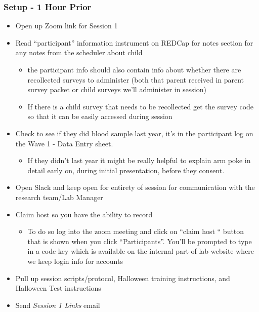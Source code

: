 \documentclass[]{book}
\providecommand{\tightlist}{%
  \setlength{\itemsep}{0pt}\setlength{\parskip}{0pt}}
\begin{document}
\hypertarget{setup---1-hour-prior-1}{%
\subsubsection{Setup - 1 Hour Prior}\label{setup---1-hour-prior-1}}

\begin{itemize}
\tightlist
\item
  Open up Zoom link for Session 1
\item
  Read ``participant'' information instrument on REDCap for notes section for any notes from the scheduler about child

  \begin{itemize}
  \tightlist
  \item
    the participant info should also contain info about whether there are recollected surveys to administer (both that parent received in parent survey packet or child surveys we'll administer in session)
  \item
    If there is a child survey that needs to be recollected get the survey code so that it can be easily accessed during session
  \end{itemize}
\item
  Check to see if they did blood sample last year, it's in the participant log on the Wave 1 - Data Entry sheet.

  \begin{itemize}
  \tightlist
  \item
    If they didn't last year it might be really helpful to explain arm poke in detail early on, during initial presentation, before they consent.
  \end{itemize}
\item
  Open Slack and keep open for entirety of session for communication with the research team/Lab Manager
\item
  Claim host so you have the ability to record

  \begin{itemize}
  \tightlist
  \item
    To do so log into the zoom meeting and click on ``claim host `` button that is shown when you click ``Participants''. You'll be prompted to type in a code key which is available on the internal part of lab website where we keep login info for accounts
  \end{itemize}
\item
  Pull up session scripts/protocol, Halloween training instructions, and Halloween Test instructions
\item
  Send \emph{Session 1 Links} email


\end{itemize}
\end{document}
